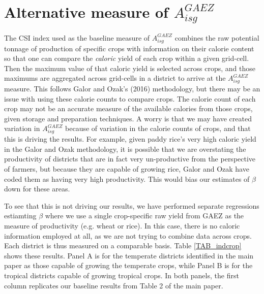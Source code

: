 \documentclass[11pt]{article}
\begin{document}
\section{Alternative measure of $A^{GAEZ}_{isg}$}
The CSI index used as the baseline measure of $A^{GAEZ}_{isg}$ combines the raw potential tonnage of production of specific crops with information on their calorie content so that one can compare the \textit{caloric} yield of each crop within a given grid-cell. Then the maximum value of that caloric yield is selected across crops, and those maximums are aggregated across grid-cells in a district to arrive at the $A^{GAEZ}_{isg}$ measure. This follows Galor and Ozak's (2016) methodology, but there may be an issue with using these calorie counts to compare crops. The calorie count of each crop may not be an accurate measure of the available calories from those crops, given storage and preparation techniques. A worry is that we may have created variation in $A^{GAEZ}_{isg}$ because of variation in the calorie counts of crops, and that this is driving the results. For example, given paddy rice's very high caloric yield in the Galor and Ozak methodology, it is possible that we are overstating the productivity of districts that are in fact very un-productive from the perspective of farmers, but because they are capable of growing rice, Galor and Ozak have coded them as having very high productivity. This would bias our estimates of $\beta$ down for these areas. 

To see that this is not driving our results, we have performed separate regressions estiamting $\beta$ where we use a single crop-specific raw yield from GAEZ as the measure of productivity (e.g. wheat or rice). In this case, there is no caloric information employed at all, as we are not trying to combine data across crops. Each district is thus measured on a comparable basis. Table \ref{TAB_indcrop} shows these results. Panel A is for the temperate districts identified in the main paper as those capable of growing the temperate crops, while Panel B is for the tropical districts capable of growing tropical crops. In both panels, the first column replicates our baseline results from Table 2 of the main paper.
\end{document}
